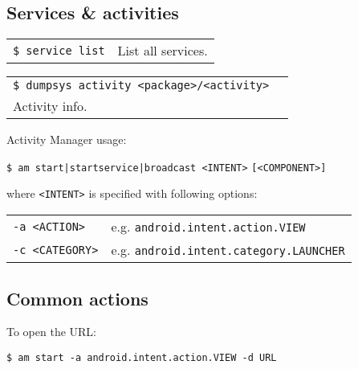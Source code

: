 \documentclass[11pt,landscape,a4paper]{article}
\begin{document}
\begin{multicols}{3}
{\subsection{Services \& activities}
\begin{tabular}{@{}ll@{}}
\texttt{\$ service list} & \hspace*{2.3cm}List all services.\\
\end{tabular}
\begin{tabular}{@{}ll@{}}
\texttt{\$ dumpsys activity <package>/<activity>} & \\
\hspace*{5cm} Activity info. & \\
\end{tabular}
}

\vspace*{2mm}
\parbox{0.30\textwidth}{
Activity Manager usage: 

\vspace*{1mm}

\texttt{\$ am start|startservice|broadcast <INTENT>}
\hspace*{6cm}\texttt{[<COMPONENT>]}

\vspace*{1mm}

where \texttt{<INTENT>} is specified with following options:

\vspace*{1mm}

\begin{tabular}{@{}ll@{}}
\texttt{-a <ACTION>} & e.g. \texttt{android.intent.action.VIEW}\\
\texttt{-c <CATEGORY>} & e.g. \texttt{android.intent.category.LAUNCHER}\\
\end{tabular}}

\vspace*{2mm}

\columnbreak
\subsection{Common actions}
\parbox{0.30\textwidth}{
To open the URL:

\vspace*{1mm}

\texttt{\$ am start -a android.intent.action.VIEW -d URL}
}


\end{multicols}
\end{document}

